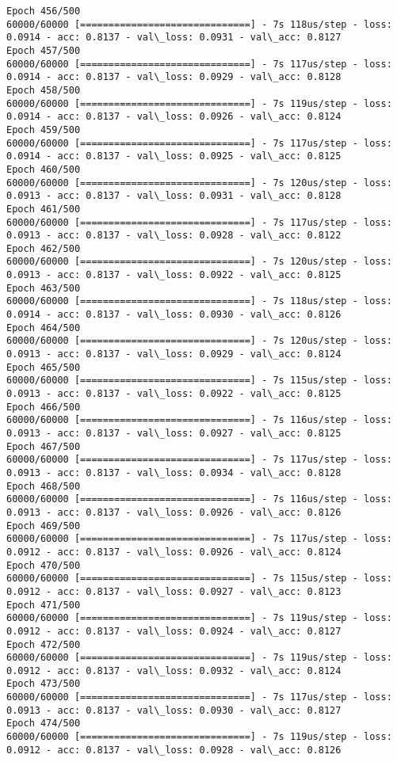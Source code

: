 \documentclass[11pt]{article}
\begin{document}
\begin{Verbatim}[commandchars=\\\{\}]
Epoch 456/500
60000/60000 [==============================] - 7s 118us/step - loss: 0.0914 - acc: 0.8137 - val\_loss: 0.0931 - val\_acc: 0.8127
Epoch 457/500
60000/60000 [==============================] - 7s 117us/step - loss: 0.0914 - acc: 0.8137 - val\_loss: 0.0929 - val\_acc: 0.8128
Epoch 458/500
60000/60000 [==============================] - 7s 119us/step - loss: 0.0914 - acc: 0.8137 - val\_loss: 0.0926 - val\_acc: 0.8124
Epoch 459/500
60000/60000 [==============================] - 7s 117us/step - loss: 0.0914 - acc: 0.8137 - val\_loss: 0.0925 - val\_acc: 0.8125
Epoch 460/500
60000/60000 [==============================] - 7s 120us/step - loss: 0.0913 - acc: 0.8137 - val\_loss: 0.0931 - val\_acc: 0.8128
Epoch 461/500
60000/60000 [==============================] - 7s 117us/step - loss: 0.0913 - acc: 0.8137 - val\_loss: 0.0928 - val\_acc: 0.8122
Epoch 462/500
60000/60000 [==============================] - 7s 120us/step - loss: 0.0913 - acc: 0.8137 - val\_loss: 0.0922 - val\_acc: 0.8125
Epoch 463/500
60000/60000 [==============================] - 7s 118us/step - loss: 0.0914 - acc: 0.8137 - val\_loss: 0.0930 - val\_acc: 0.8126
Epoch 464/500
60000/60000 [==============================] - 7s 120us/step - loss: 0.0913 - acc: 0.8137 - val\_loss: 0.0929 - val\_acc: 0.8124
Epoch 465/500
60000/60000 [==============================] - 7s 115us/step - loss: 0.0913 - acc: 0.8137 - val\_loss: 0.0922 - val\_acc: 0.8125
Epoch 466/500
60000/60000 [==============================] - 7s 116us/step - loss: 0.0913 - acc: 0.8137 - val\_loss: 0.0927 - val\_acc: 0.8125
Epoch 467/500
60000/60000 [==============================] - 7s 117us/step - loss: 0.0913 - acc: 0.8137 - val\_loss: 0.0934 - val\_acc: 0.8128
Epoch 468/500
60000/60000 [==============================] - 7s 116us/step - loss: 0.0913 - acc: 0.8137 - val\_loss: 0.0926 - val\_acc: 0.8126
Epoch 469/500
60000/60000 [==============================] - 7s 117us/step - loss: 0.0912 - acc: 0.8137 - val\_loss: 0.0926 - val\_acc: 0.8124
Epoch 470/500
60000/60000 [==============================] - 7s 115us/step - loss: 0.0912 - acc: 0.8137 - val\_loss: 0.0927 - val\_acc: 0.8123
Epoch 471/500
60000/60000 [==============================] - 7s 119us/step - loss: 0.0912 - acc: 0.8137 - val\_loss: 0.0924 - val\_acc: 0.8127
Epoch 472/500
60000/60000 [==============================] - 7s 119us/step - loss: 0.0912 - acc: 0.8137 - val\_loss: 0.0932 - val\_acc: 0.8124
Epoch 473/500
60000/60000 [==============================] - 7s 117us/step - loss: 0.0913 - acc: 0.8137 - val\_loss: 0.0930 - val\_acc: 0.8127
Epoch 474/500
60000/60000 [==============================] - 7s 119us/step - loss: 0.0912 - acc: 0.8137 - val\_loss: 0.0928 - val\_acc: 0.8126

\end{Verbatim}
\end{document}
